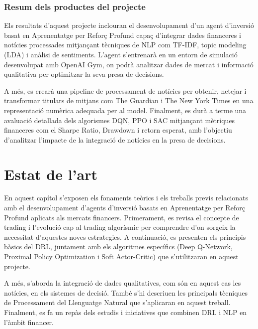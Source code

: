 \documentclass[12pt,a4paper,twoside]{book}
\begin{document}
\subsection{Resum dels productes del projecte}

Els resultats d’aquest projecte inclouran el desenvolupament d’un agent d’inversió basat en Aprenentatge per Reforç Profund capaç d’integrar dades financeres i notícies processades mitjançant tècniques de NLP com TF-IDF, topic modeling (LDA) i anàlisi de sentiments. L’agent s’entrenarà en un entorn de simulació desenvolupat amb OpenAI Gym, on podrà analitzar dades de mercat i informació qualitativa per optimitzar la seva presa de decisions.

A més, es crearà una pipeline de processament de notícies per obtenir, netejar i transformar titulars de mitjans com The Guardian i The New York Times en una representació numèrica adequada per al model. Finalment, es durà a terme una avaluació detallada dels algorismes DQN, PPO i SAC mitjançant mètriques financeres com el Sharpe Ratio, Drawdown i retorn esperat, amb l’objectiu d’analitzar l’impacte de la integració de notícies en la presa de decisions.


\chapter{Estat de l'art}

En aquest capítol s'exposen els fonaments teòrics i els treballs previs relacionats amb el desenvolupament d'agents d'inversió basats en Aprenentatge per Reforç Profund aplicats als mercats financers. Primerament, es revisa el concepte de trading i l'evolució cap al trading algorísmic per comprendre d'on sorgeix la necessitat d'aquestes noves estrategies. A continuació, es presenten els principis bàsics del DRL, juntament amb els algoritmes específics (Deep Q-Network, Proximal Policy Optimization i Soft Actor-Critic) que s'utilitzaran en aquest projecte.

A més, s'aborda la integració de dades qualitatives, com són en aquest cas les notícies, en els sistemes de decisió. També s'hi descriuen les principals tècniques de Processament del Llenguatge Natural que s'aplicaran en aquest treball. Finalment, es fa un repàs dels estudis i iniciatives que combinen DRL i NLP en l'àmbit financer.
\end{document}
